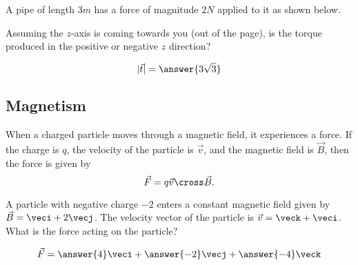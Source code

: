 \documentclass{ximera}
\begin{document}
\begin{question}
  A pipe of length $3 \unit{m}$ has a force of magnitude $2 \unit{N}$
  applied to it as shown below.
  \begin{image}
  \end{image}
  Assuming the $z$-axis is coming towards you (out of the page), is
  the torque produced in the positive or negative $z$ direction?
  \begin{prompt}
  \begin{multipleChoice}
  \end{multipleChoice}  
  \[
  |\vec{t}| = \answer{3\sqrt{3}}
  \]
  \end{prompt}
\end{question}



\subsection{Magnetism} 

When a charged particle moves through a magnetic field, it experiences
a force.  If the charge is $q$, the velocity of the particle is
$\vec{v}$, and the magnetic field is $\vec{B}$, then the force is
given by
\[
\vec{F} = q\vec{v} \cross \vec{B}.
\]

\begin{question}
  A particle with negative charge $-2$ enters a constant magnetic
  field given by $\vec{B} = \veci+2\vecj$.  The velocity vector of
  the particle is $\vec{v} = \veck+\veci$.  What is the force
  acting on the particle?
  \begin{prompt}
  \[
  \vec{F} = \answer{4}\veci+\answer{-2}\vecj+\answer{-4}\veck
  \]
  \end{prompt}
\end{question}
\end{document}

